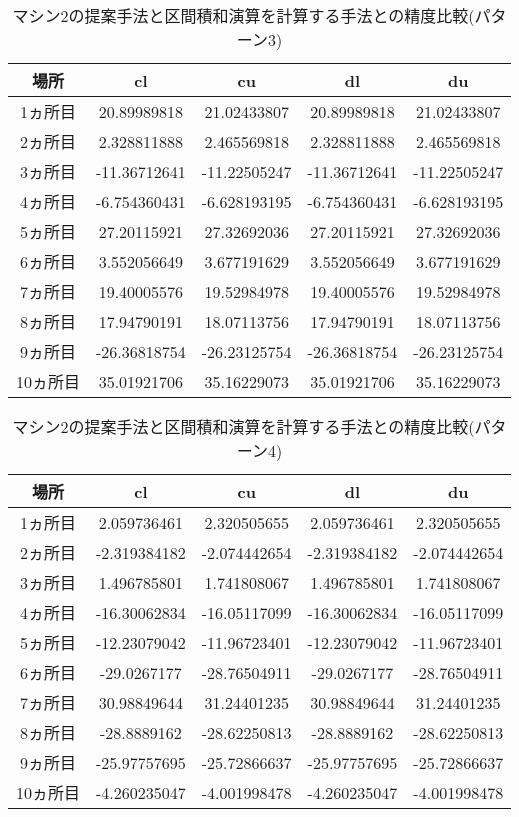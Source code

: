 \documentclass[11pt,a4paper]{jsreport}
\theoremstyle{definition}
\begin{document}
\begin{table}[H]
\centering
\begin{tabular}{|c|c|c|c|c|}
\hline
場所 & cl & cu & dl & du \\ \hline
1ヵ所目 & 20.89989818 & 21.02433807 & 20.89989818 & 21.02433807 \\ \hline
2ヵ所目 & 2.328811888 & 2.465569818 & 2.328811888 & 2.465569818 \\ \hline
3ヵ所目 & -11.36712641 & -11.22505247 & -11.36712641 & -11.22505247 \\ \hline
4ヵ所目 & -6.754360431 & -6.628193195 & -6.754360431 & -6.628193195 \\ \hline
5ヵ所目 & 27.20115921 & 27.32692036 & 27.20115921 & 27.32692036 \\ \hline
6ヵ所目 & 3.552056649 & 3.677191629 & 3.552056649 & 3.677191629 \\ \hline
7ヵ所目 & 19.40005576 & 19.52984978 & 19.40005576 & 19.52984978 \\ \hline
8ヵ所目 & 17.94790191 & 18.07113756 & 17.94790191 & 18.07113756 \\ \hline
9ヵ所目 & -26.36818754 & -26.23125754 & -26.36818754 & -26.23125754 \\ \hline
10ヵ所目 & 35.01921706 & 35.16229073 & 35.01921706 & 35.16229073 \\ \hline
\end{tabular}
\caption{マシン2の提案手法と区間積和演算を計算する手法との精度比較(パターン3)}
\end{table}

\begin{table}[H]
\centering
\begin{tabular}{|c|c|c|c|c|}
\hline
場所 & cl & cu & dl & du \\ \hline
1ヵ所目 & 2.059736461 & 2.320505655 & 2.059736461 & 2.320505655 \\ \hline
2ヵ所目 & -2.319384182 & -2.074442654 & -2.319384182 & -2.074442654 \\ \hline
3ヵ所目 & 1.496785801 & 1.741808067 & 1.496785801 & 1.741808067 \\ \hline
4ヵ所目 & -16.30062834 & -16.05117099 & -16.30062834 & -16.05117099 \\ \hline
5ヵ所目 & -12.23079042 & -11.96723401 & -12.23079042 & -11.96723401 \\ \hline
6ヵ所目 & -29.0267177 & -28.76504911 & -29.0267177 & -28.76504911 \\ \hline
7ヵ所目 & 30.98849644 & 31.24401235 & 30.98849644 & 31.24401235 \\ \hline
8ヵ所目 & -28.8889162 & -28.62250813 & -28.8889162 & -28.62250813 \\ \hline
9ヵ所目 & -25.97757695 & -25.72866637 & -25.97757695 & -25.72866637 \\ \hline
10ヵ所目 & -4.260235047 & -4.001998478 & -4.260235047 & -4.001998478 \\ \hline
\end{tabular}
\caption{マシン2の提案手法と区間積和演算を計算する手法との精度比較(パターン4)}
\end{table}
\end{document}
